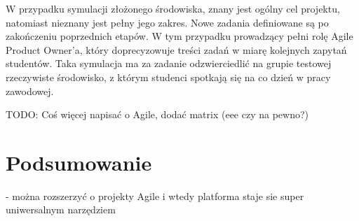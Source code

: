 W przypadku symulacji złożonego środowiska, znany jest ogólny cel projektu, natomiast nieznany jest pełny jego zakres.
Nowe zadania definiowane są po zakończeniu poprzednich etapów.
W tym przypadku prowadzący pełni rolę Agile Product Owner’a, który doprecyzowuje treści zadań w miarę kolejnych zapytań studentów.
Taka symulacja ma za zadanie odzwierciedlić na grupie testowej rzeczywiste środowisko, z którym studenci spotkają się na co dzień w pracy zawodowej.


TODO: Coś więcej napisać o Agile, dodać matrix (eee czy na pewno?)


\section{Podsumowanie}
\label{research_summary}

- można rozszerzyć o projekty Agile i wtedy platforma staje sie super uniwersalnym narzędziem




